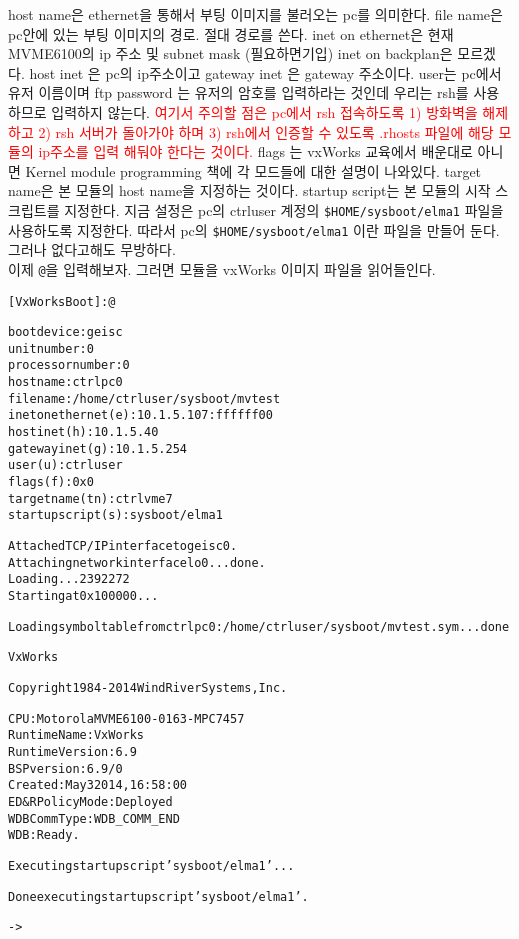 \documentclass[11pt,a4paper]{article}
\begin{document}
host name은 ethernet을 통해서 부팅 이미지를 불러오는 pc를 의미한다.
file name은 pc안에 있는 부팅 이미지의 경로. 절대 경로를 쓴다.
inet on ethernet은 현재 MVME6100의 ip 주소 및 subnet mask (필요하면기입)
inet on backplan은 모르겠다. host inet 은 pc의 ip주소이고 gateway inet 은 gateway 주소이다.
user는 pc에서 유저 이름이며 ftp password 는 유저의 암호를 입력하라는 것인데 우리는 rsh를 사용하므로 입력하지 않는다.
\textcolor{red}{여기서 주의할 점은 pc에서 rsh 접속하도록 1) 방화벽을 해제하고 2) rsh 서버가 돌아가야 하며 3) rsh에서 인증할 수 있도록 
.rhosts 파일에 해당 모듈의 ip주소를 입력 해둬야 한다는 것이다.}
flags 는 vxWorks 교육에서 배운대로 아니면 Kernel module programming 책에 각 모드들에 대한 설명이 나와있다.
target name은 본 모듈의 host name을 지정하는 것이다. startup script는 본 모듈의 시작 스크립트를 지정한다. 
지금 설정은 pc의 ctrluser 계정의 \verb|$HOME/sysboot/elma1| 파일을 사용하도록 지정한다. 
따라서 pc의 \verb|$HOME/sysboot/elma1| 이란 파일을 만들어 둔다. 그러나 없다고해도 무방하다.\\

이제 \verb|@|을 입력해보자. 그러면 모듈을 vxWorks 이미지 파일을 읽어들인다.
\begin{framed}
\begin{alltt}
[VxWorks Boot]: @

boot device          : geisc
unit number          : 0 
processor number     : 0 
host name            : ctrlpc0
file name            : /home/ctrluser/sysboot/mvtest
inet on ethernet (e) : 10.1.5.107:ffffff00
host inet (h)        : 10.1.5.40
gateway inet (g)     : 10.1.5.254
user (u)             : ctrluser
flags (f)            : 0x0 
target name (tn)     : ctrlvme7
startup script (s)   : sysboot/elma1

Attached TCP/IP interface to geisc0.
Attaching network interface lo0... done.
Loading... 2392272
Starting at 0x100000...

Loading symbol table from ctrlpc0:/home/ctrluser/sysboot/mvtest.sym ...done


                VxWorks

Copyright 1984-2014  Wind River Systems, Inc.

             CPU: Motorola MVME6100-0163 - MPC 7457
    Runtime Name: VxWorks
 Runtime Version: 6.9
     BSP version: 6.9/0
         Created: May  3 2014, 16:58:00
ED&R Policy Mode: Deployed
   WDB Comm Type: WDB_COMM_END
             WDB: Ready.

Executing startup script 'sysboot/elma1'...

Done executing startup script 'sysboot/elma1'.

-> 
\end{alltt}
\end{framed}
\end{document}

